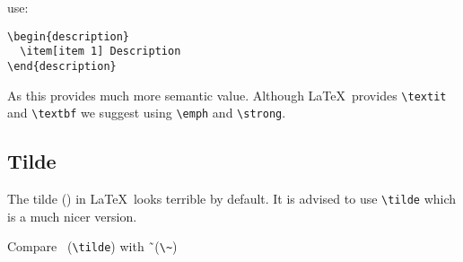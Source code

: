 \documentclass[11pt,a4paper]{article}
\begin{document}
use:

\begin{verbatim}
\begin{description}
  \item[item 1] Description
\end{description}
\end{verbatim}

As this provides much more semantic value. Although \LaTeX\ provides
\verb|\textit| and \verb|\textbf| we suggest using \verb|\emph| and
\verb|\strong|.

\subsection{Tilde}
\label{sec:tilde}

The tilde (\tilde) in \LaTeX\ looks terrible by default. It is advised to use
\verb|\tilde| which is a much nicer version.

Compare \tilde\ (\verb|\tilde|) with \~\ (\verb|\~|)

\
\end{document}
